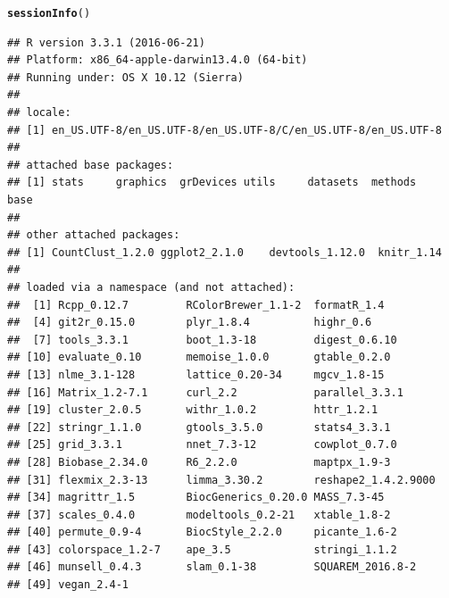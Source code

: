 \documentclass[12pt]{article}\usepackage[]{graphicx}\usepackage[usenames,dvipsnames]{color}
\makeatletter
\newcommand{\hlstd}[1]{\textcolor[rgb]{0.345,0.345,0.345}{#1}}%
\newcommand{\hlkwd}[1]{\textcolor[rgb]{0.737,0.353,0.396}{\textbf{#1}}}%
\newenvironment{kframe}{%
 \def\at@end@of@kframe{}%
 \ifinner\ifhmode%
  \def\at@end@of@kframe{\end{minipage}}%
  \begin{minipage}{\columnwidth}%
 \fi\fi%
 \def\FrameCommand##1{\hskip\@totalleftmargin \hskip-\fboxsep
 \colorbox{shadecolor}{##1}\hskip-\fboxsep
     \hskip-\linewidth \hskip-\@totalleftmargin \hskip\columnwidth}%
 \MakeFramed {\advance\hsize-\width
   \@totalleftmargin\z@ \linewidth\hsize
   \@setminipage}}%
 {\par\unskip\endMakeFramed%
 \at@end@of@kframe}
\newenvironment{knitrout}{}{} %
\makeatother
\begin{document}
\begin{knitrout}
\color{fgcolor}\begin{kframe}
\begin{alltt}
\hlkwd{sessionInfo}\hlstd{()}
\end{alltt}
\begin{verbatim}
## R version 3.3.1 (2016-06-21)
## Platform: x86_64-apple-darwin13.4.0 (64-bit)
## Running under: OS X 10.12 (Sierra)
## 
## locale:
## [1] en_US.UTF-8/en_US.UTF-8/en_US.UTF-8/C/en_US.UTF-8/en_US.UTF-8
## 
## attached base packages:
## [1] stats     graphics  grDevices utils     datasets  methods   base     
## 
## other attached packages:
## [1] CountClust_1.2.0 ggplot2_2.1.0    devtools_1.12.0  knitr_1.14      
## 
## loaded via a namespace (and not attached):
##  [1] Rcpp_0.12.7         RColorBrewer_1.1-2  formatR_1.4        
##  [4] git2r_0.15.0        plyr_1.8.4          highr_0.6          
##  [7] tools_3.3.1         boot_1.3-18         digest_0.6.10      
## [10] evaluate_0.10       memoise_1.0.0       gtable_0.2.0       
## [13] nlme_3.1-128        lattice_0.20-34     mgcv_1.8-15        
## [16] Matrix_1.2-7.1      curl_2.2            parallel_3.3.1     
## [19] cluster_2.0.5       withr_1.0.2         httr_1.2.1         
## [22] stringr_1.1.0       gtools_3.5.0        stats4_3.3.1       
## [25] grid_3.3.1          nnet_7.3-12         cowplot_0.7.0      
## [28] Biobase_2.34.0      R6_2.2.0            maptpx_1.9-3       
## [31] flexmix_2.3-13      limma_3.30.2        reshape2_1.4.2.9000
## [34] magrittr_1.5        BiocGenerics_0.20.0 MASS_7.3-45        
## [37] scales_0.4.0        modeltools_0.2-21   xtable_1.8-2       
## [40] permute_0.9-4       BiocStyle_2.2.0     picante_1.6-2      
## [43] colorspace_1.2-7    ape_3.5             stringi_1.1.2      
## [46] munsell_0.4.3       slam_0.1-38         SQUAREM_2016.8-2   
## [49] vegan_2.4-1
\end{verbatim}
\end{kframe}
\end{knitrout}
\end{document}
